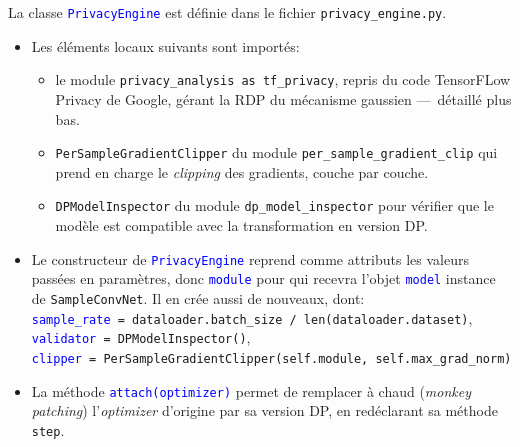 \documentclass[a4paper,11pt]{article} %
\newcommand{\ttt}[1]{\texttt{#1}}
\newcommand{\file}[1]{\colorbox{blue!10}{\texttt{#1}}}
\newcommand{\code}[1]{\textcolor{blue}{\texttt{#1}}}
\begin{document}
La classe \code{PrivacyEngine} est définie dans le fichier \file{privacy\_engine.py}.
\begin{itemize}
    \item
    Les éléments locaux suivants sont importés:
        \begin{itemize}
        \item
        le module \ttt{privacy\_analysis as tf\_privacy}, repris du code TensorFLow Privacy de Google, gérant la RDP du mécanisme gaussien ---~détaillé plus bas.
        \item
        \ttt{PerSampleGradientClipper} du module \ttt{per\_sample\_gradient\_clip} qui prend en charge le \emph{clipping} des gradients, couche par couche.
        \item
        \ttt{DPModelInspector} du module \ttt{dp\_model\_inspector} pour vérifier que le modèle est compatible avec la transformation en version DP.
    \end{itemize}

    \item
    Le constructeur de \code{PrivacyEngine} reprend comme attributs les valeurs passées en paramètres, donc \code{module} pour qui recevra l'objet \code{model} instance de \ttt{SampleConvNet}. Il en crée aussi de nouveaux, dont:\\
         \code{sample\_rate}\ttt{ = dataloader.batch\_size / len(dataloader.dataset)},\\
         \code{validator}\ttt{ = DPModelInspector()},\\
         \code{clipper}\ttt{ = PerSampleGradientClipper(self.module, self.max\_grad\_norm)}

    \item
    La méthode \code{attach(optimizer)} permet de remplacer à chaud (\emph{monkey patching}) l'\emph{optimizer} d'origine par sa version DP, en redéclarant sa méthode \ttt{step}.


\end{itemize}
\end{document}
